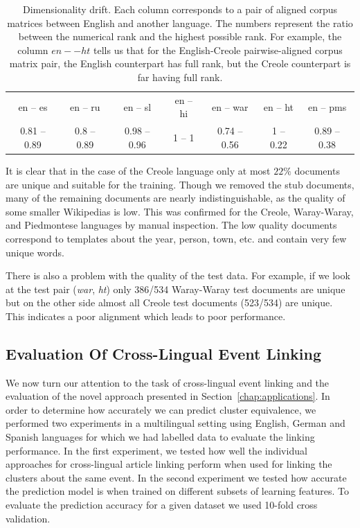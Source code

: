 \begin{table}[t]
\begin{center}
\begin{tabular}{|c|c|c|c|c|c|c|}
\cline{1-7}
en -- es     &   en -- ru     &   en -- sl       &     en -- hi &   en -- war      &      en -- ht &   en -- pms\\
\cline{1-7}
0.81 -- 0.89   &  0.8 -- 0.89  &   0.98 -- 0.96    &    1 -- 1  &  0.74 -- 0.56  &      1 -- 0.22  &   0.89 -- 0.38\\
\cline{1-7}
\end{tabular}
\end{center}
\caption{Dimensionality drift. Each column corresponds to a pair of aligned corpus matrices between
English and another language. The numbers represent the ratio between the numerical rank and the highest
possible rank. For example, the column $en -- ht$ tells us that for the English-Creole pairwise-aligned
corpus matrix pair, the English counterpart has full rank, but the Creole counterpart is far having full rank.}
\label{table:rank}
\end{table}

It is clear that in the case of the Creole language only at most $22\%$ documents are unique and suitable 
for the training. Though we removed the stub documents, many of the remaining documents are nearly indistinguishable, 
as the quality of some smaller Wikipedias is low. This was confirmed for the Creole, Waray-Waray, 
and Piedmontese languages by manual inspection. The low quality documents correspond to templates 
about the year, person, town, etc. and contain very few unique words.

There is also a problem with the quality of the test data. For example, if we look at the 
test pair (\emph{war}, \emph{ht}) only 386/534 Waray-Waray test documents are unique but 
on the other side almost all Creole test documents (523/534) are unique. This indicates a poor 
alignment which leads to poor performance.


\subsection{Evaluation Of Cross-Lingual Event Linking}
We now turn our attention to the task of cross-lingual event linking and the 
evaluation of the novel approach presented in Section~\ref{chap:applications}.
In order to determine how accurately we can predict cluster equivalence, we performed two 
experiments in a multilingual setting using English, German and Spanish languages for which 
we had labelled data to evaluate the linking performance. In the first experiment, 
we tested how well the individual approaches for cross-lingual article linking 
perform when used for linking the clusters about the same event. In the second 
experiment we tested how accurate the prediction model is when trained on different 
subsets of learning features. To evaluate the prediction accuracy for a given dataset 
we used 10-fold cross validation.

